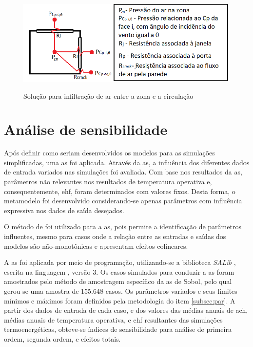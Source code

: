 \begin{figure}[h]
	\centering
	\caption{Solução para infiltração de ar entre a zona e a circulação}
	\includegraphics[width=.8\linewidth]{img/AFN_crack2.png}
	\label{fig:AFN_crack}
\end{figure}

\section{Análise de sensibilidade}

Após definir como seriam desenvolvidos os modelos para as simulações simplificadas, uma \acrfull{as} foi aplicada. Através da \acrshort{as}, a influência dos diferentes dados de entrada variados nas simulações foi avaliada. Com base nos resultados da \acrshort{as}, parâmetros não relevantes nos resultados de temperatura operativa e, consequentemente, \acrfull{ehf}, foram determinados com valores fixos. Desta forma, o metamodelo foi desenvolvido considerando-se apenas parâmetros com influência expressiva nos dados de saída desejados.

O método de  \cite{Sobol1993} foi utilizado para a \acrshort{as}, pois permite a identificação de parâmetros influentes, mesmo para casos onde a relação entre as entradas e saídas dos modelos são não-monotônicas e apresentam efeitos colineares.

A \acrshort{as} foi aplicada por meio de programação, utilizando-se a biblioteca \textit{SALib} \cite{Herman2017}, escrita na linguagem , versão 3.
Os casos simulados para conduzir a \acrshort{as} foram amostrados pelo método de amostragem específico da \acrshort{as} de Sobol, pelo qual gerou-se uma amostra de 155.648 casos.
Os parâmetros variados e seus limites mínimos e máximos foram definidos pela metodologia do item \ref{subsec:par}. 
A partir dos dados de entrada de cada caso, e dos valores das médias anuais de \acrshort{ach}, médias anuais de temperatura operativa, e \acrshort{ehf} resultantes das simulações termoenergéticas, obteve-se índices de sensibilidade para análise de primeira ordem, segunda ordem, e efeitos totais.
\newpage

